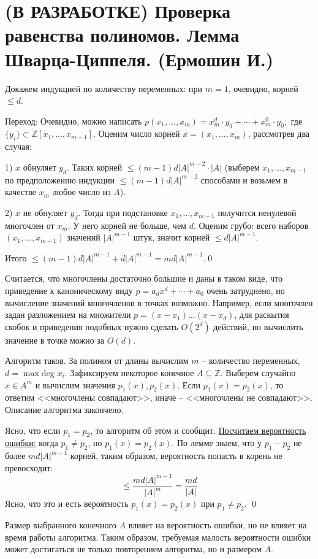 \section{(В РАЗРАБОТКЕ) Проверка равенства полиномов. Лемма Шварца-Циппеля. (Ермошин И.)}

Докажем индукцией по количеству переменных: при $m=1$, очевидно, корней $\le d$.

Переход: 
Очевидно, можно написать $p(x_1,\ldots,x_m)=x_m^d\cdot y_d+\cdots+x_m^0\cdot y_0,$ где $\{y_i\}\subset \mathbb Z[x_1,\ldots,x_{m-1}]$. Оценим число корней $x = (x_1, \ldots, x_m)$, рассмотрев два случая:

1) $x$ обнуляет $y_d$. Таких корней $\le (m-1)d|A|^{m-2} \cdot |A|$ (выберем $x_1,\ldots,x_{m-1}$ по предположению индукции $\le(m-1)d|A|^{m-2}$ способами и возьмем в качестве $x_m$ любое число из $A$).

2) $x$ не обнуляет $y_d$. Тогда при подстановке $x_1, \ldots, x_{m-1}$ получится ненулевой многочлен от $x_m$. У него корней не больше, чем $d$. Оценим грубо: всего наборов $(x_1, \ldots, x_{m-1})$ значений $|A|^{m-1}$ штук, значит корней $\le d|A|^{m-1}$.

Итого $\le (m-1)d|A|^{m-1}+d|A|^{m-1}=md|A|^{m-1}.$\qed


Считается, что многочлены достаточно большие и даны в таком виде, что приведение к каноническому виду $p = a_d x^d + \cdots + a_0$ очень затруднено, но вычисление значений многочленов в точках возможно. Например, если многочлен задан разложением на множители $p = (x-x_1)\ldots(x-x_d)$, для раскытия скобок и приведения подобных нужно сделать $O(2^d)$ действий, но вычислить значение в точке можно за $O(d)$.

Алгоритм таков. За полином от длины вычислим $m$ -- количество переменных, $d = \max\text{deg } x_i$. Зафиксируем некоторое конечное $A \subseteq \mathbb Z$. Выберем случайно $x \in A^m$ и вычислим значения $p_1(x), p_2(x)$. Если $p_1(x) = p_2(x)$, то ответим <<многочлены совпадают>>, иначе -- <<многочлены не совпадают>>. Описание алгоритма закончено.

Ясно, что если $p_1=p_2$, то алгоритм об этом и сообщит. \underline{Посчитаем вероятность ошибки:} когда $p_1 \neq p_2$, но $p_1(x) = p_2(x)$. По лемме знаем, что у $p_1-p_2$ не более $md|A|^{m-1}$ корней, таким образом, вероятность попасть в корень не превосходит: $$\leq \frac{md|A|^{m-1}}{|A|^m} = \frac{md}{|A|}$$ Ясно, что это и есть вероятность $p_1(x)=p_2(x)$ при $p_1 \neq p_2$. \qed

 Размер выбранного конечного $A$ влияет на вероятность ошибки, но не влияет на время работы алгоритма. Таким образом, требуемая малость вероятности ошибки может достигаться не только повторением алгоритма, но и размером $A$.
